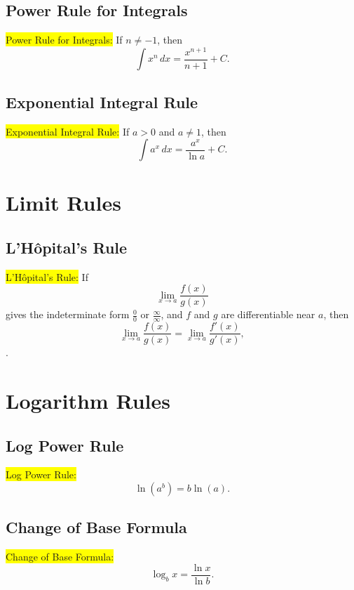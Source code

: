 \documentclass{article}
\begin{document}
\subsection*{Power Rule for Integrals}
\colorbox{yellow}{Power Rule for Integrals:}
If $n\neq -1$, then
\[
\int x^n\,dx=\frac{x^{n+1}}{n+1}+C.
\]

\subsection*{Exponential Integral Rule}
\colorbox{yellow}{Exponential Integral Rule:}
If $a>0$ and $a\neq1$, then
\[
\int a^x\,dx=\frac{a^x}{\ln a}+C.
\]

\section{Limit Rules}

\subsection*{L'Hôpital's Rule}
\colorbox{yellow}{L'Hôpital's Rule:}
If
\[
\lim_{x\to a}\frac{f(x)}{g(x)}
\]
gives the indeterminate form $\frac{0}{0}$ or $\frac{\infty}{\infty}$, and $f$ and $g$ are differentiable near $a$, then
\[
\lim_{x\to a}\frac{f(x)}{g(x)}
=
\lim_{x\to a}\frac{f'(x)}{g'(x)},
\].

\section{Logarithm Rules}

\subsection*{Log Power Rule}
\colorbox{yellow}{Log Power Rule:}
\[
\ln(a^b)=b\ln(a).
\]

\subsection*{Change of Base Formula}
\colorbox{yellow}{Change of Base Formula:}
\[
\log_b x=\frac{\ln x}{\ln b}.
\]
\end{document}
